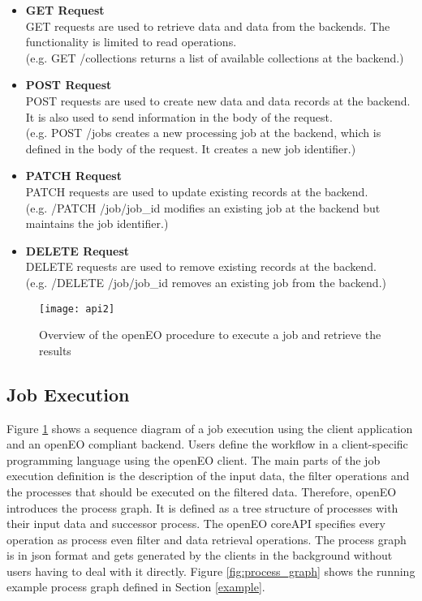 \documentclass[draft,final]{vutinfth} %
\begin{document}
\begin{itemize}
	\item \textbf{GET Request} \\
	GET requests are used to retrieve data and data from the backends. The functionality is limited to read operations. \\(e.g. GET /collections returns a list of available collections at the backend.)
	\item \textbf{POST Request} \\ 
	POST requests are used to create new data and data records at the backend. It is also used to send information in the body of the request. \\(e.g. POST /jobs creates a new processing job at the backend, which is defined in the body of the request. It creates a new job identifier.)  
	\item \textbf{PATCH Request} \\
	PATCH requests are used to update existing records at the backend. \\(e.g. /PATCH /job/{job\_id} modifies an existing job at the backend but maintains the job identifier.)
	\item \textbf{DELETE Request} \\ 
	DELETE requests are used to remove existing records at the backend. \\(e.g. /DELETE /job/{job\_id} removes an existing job from the backend.)
\end{itemize}
\begin{figure}[h]
	\centering
	\texttt{[image: api2]}
	\caption{Overview of the openEO procedure to execute a job and retrieve the results}
	\label{fig:api2} %
\end{figure}


\subsection{Job Execution}\label{Job Execution}
Figure \ref{fig:api2} shows a sequence diagram of a job execution using the client application and an openEO compliant backend. Users define the workflow in a client-specific programming language using the openEO client. The main parts of the job execution definition is the description of the input data, the filter operations and the processes that should be executed on the filtered data. Therefore, openEO introduces the process graph. It is defined as a tree structure of processes with their input data and successor process. The openEO coreAPI specifies every operation as process even filter and data retrieval operations. The process graph is in \gls{json} format and gets generated by the clients in the background without users having to deal with it directly. Figure \ref{fig:process_graph} shows the running example process graph defined in Section \ref{example}.  
\end{document}
